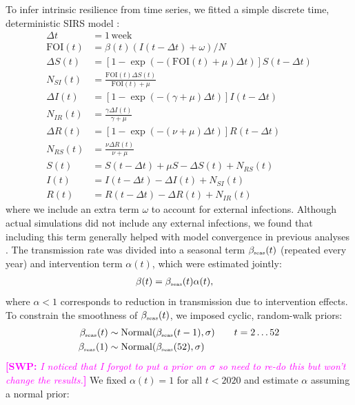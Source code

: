 \documentclass[12pt]{article}
\newcommand{\comment}{\showcomment}
\newcommand{\showcomment}[3]{\textcolor{#1}{\textbf{[#2: }\textsl{#3}\textbf{]}}}
\newcommand{\swp}[1]{\comment{magenta}{SWP}{#1}}
\newcommand{\tsub}[2]{#1_{{\textrm{\tiny #2}}}}
\begin{document}
To infer intrinsic resilience from time series, we fitted a simple discrete time, deterministic SIRS model \citep{park2024predicting}:
\begin{align}
\Delta t &= 1\,\mathrm{week}\\
\textrm{FOI}(t) &= \beta(t) (I(t- \Delta t)+\omega)/N\\
\Delta S(t) &= \left[1- \exp(-(\textrm{FOI}(t) + \mu) \Delta t )\right] S(t-\Delta t)\\
N_{SI}(t) &= \frac{\textrm{FOI}(t)\Delta S(t)}{\textrm{FOI}(t) + \mu} \\
\Delta I(t) &= \left[1- \exp(-(\gamma + \mu) \Delta t )\right] I(t-\Delta t)\\
N_{IR}(t) &= \frac{\gamma \Delta I(t)}{\gamma + \mu} \\
\Delta R(t) &= \left[1- \exp(-(\nu + \mu) \Delta t )\right] R(t-\Delta t)\\
N_{RS}(t) &= \frac{\nu \Delta R(t)}{\nu + \mu} \\
S(t) &= S(t-\Delta t) + \mu S - \Delta S(t) + N_{RS}(t)  \\
I(t) &= I(t-\Delta t) - \Delta I(t) + N_{SI}(t)  \\
R(t) &= R(t-\Delta t) - \Delta R(t) + N_{IR}(t)
\end{align}
where we include an extra term $\omega$ to account for external infections.
Although actual simulations did not include any external infections, we found that including this term generally helped with model convergence in previous analyses \citep{park2024predicting}.
The transmission rate was divided into a seasonal term $\tsub{\beta}{seas}(t)$ (repeated every year) and intervention term $\alpha(t)$, which were estimated jointly:
\begin{align}
\beta(t) &= \tsub{\beta}{seas}(t) \alpha(t),
\end{align}
where $\alpha < 1$ corresponds to reduction in transmission due to intervention effects.
To constrain the smoothness of $\tsub{\beta}{seas}(t)$, we imposed cyclic, random-walk priors:
\begin{align}
\tsub{\beta}{seas}(t) &\sim \mathrm{Normal}(\tsub{\beta}{seas}(t-1), \sigma) \qquad t = 2 \dots 52\\
\tsub{\beta}{seas}(1) &\sim \mathrm{Normal}(\tsub{\beta}{seas}(52), \sigma)
\end{align}
\swp{I noticed that I forgot to put a prior on $\sigma$ so need to re-do this but won't change the results.}
We fixed $\alpha(t)=1$ for all $t < 2020$ and estimate $\alpha$ assuming a normal prior:
\end{document}
